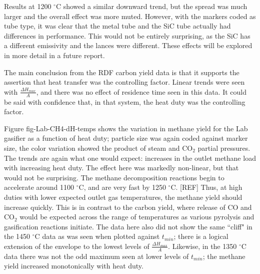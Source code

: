 \documentclass[11pt,twocolumn]{article}
\begin{document}

Results at 1200 $^{\circ}$C showed a similar downward trend, but the spread was much larger and the overall effect was more muted.  However, with the markers coded as tube type, it was clear that the metal tube and the SiC tube actually had differences in performance.  This would not be entirely surprising, as the SiC has a different emissivity and the lances were different.  These effects will be explored in more detail in a future report.

The main conclusion from the RDF carbon yield data is that it supports the assertion that heat transfer was the controlling factor.  Linear trends were seen with $\frac{\Delta H_{max}}{A}$, and there was no effect of residence time seen in this data.  It could be said with confidence that, in that system, the heat duty was the controlling factor.

Figure {fig-Lab-CH4-dH-temps} shows the variation in methane yield for the Lab gasifier as a function of heat duty; particle size was again coded against marker size, the color variation showed the product of steam and CO$_2$ partial pressures.  The trends are again what one would expect: increases in the outlet methane load with increasing heat duty.  The effect here was markedly non-linear, but that would not be surprising.  The methane decomposition reactions begin to accelerate around 1100 $^{\circ}$C, and are very fast by 1250 $^{\circ}$C.  [REF]  Thus, at high duties with lower expected outlet gas temperatures, the methane yield should increase quickly.  This is in contrast to the carbon yield, where release of CO and CO$_2$ would be expected across the range of temperatures as various pyrolysis and gasification reactions initiate.  The data here also did not show the same ``cliff" in the 1450 $^{\circ}$C data as was seen when plotted against $t_{min}$; there is a logical extension of the envelope to the lowest levels of $\frac{\Delta H_{max}}{A}$.  Likewise, in the 1350 $^{\circ}$C data there was not the odd maximum seen at lower levels of $t_{min}$; the methane yield increased monotonically with heat duty.
\end{document}
